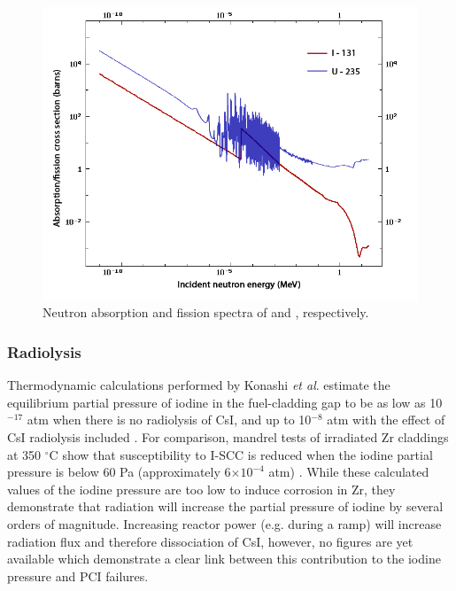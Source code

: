\begin{figure}[ht] %
\centering
\includegraphics[width=14cm]{images/te_i_xsection.png}
\caption[Neutron absorption and fission spectra of  and , respectively.]{Neutron absorption and fission spectra of  and , respectively.}
\label{figure:te_i_xsection}
\end{figure}

\subsubsection{Radiolysis}

Thermodynamic calculations performed by Konashi \emph{et al}. estimate the equilibrium partial pressure of iodine in the fuel-cladding gap to be as low as 10$^{-17}$ atm when there is no radiolysis of CsI, and up to 10$^{-8}$ atm with the effect of CsI radiolysis included \cite{Konashi1983}. For comparison, mandrel tests of irradiated Zr claddings at 350 $^{\circ}$C show that susceptibility to I-SCC is reduced when the iodine partial pressure is below 60 Pa (approximately 6$\times 10^{-4}$ atm) \cite{anghel2010experimental}. While these calculated values of the iodine pressure are too low to induce corrosion in Zr, they demonstrate that radiation will increase the partial pressure of iodine by several orders of magnitude. Increasing reactor power (e.g. during a ramp) will increase radiation flux and therefore dissociation of CsI, however, no figures are yet available which demonstrate a clear link between this contribution to the iodine pressure and PCI failures. 

